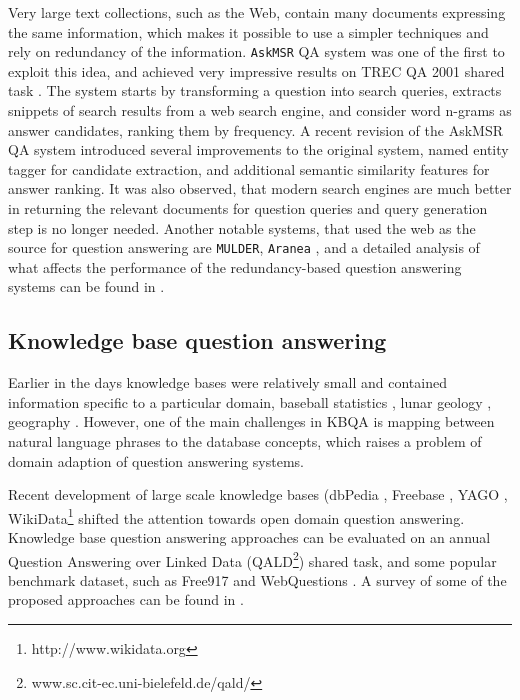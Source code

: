 Very large text collections, such as the Web, contain many documents expressing the same information, which makes it possible to use a simpler techniques and rely on redundancy of the information.
\texttt{AskMSR} QA system was one of the first to exploit this idea, and achieved very impressive results on TREC QA 2001 shared task \cite{brill2002analysis}.
The system starts by transforming a question into search queries, extracts snippets of search results from a web search engine, and consider word n-grams as answer candidates, ranking them by frequency.
A recent revision of the AskMSR QA system \cite{tsai2015web} introduced several improvements to the original system, \ie named entity tagger for candidate extraction, and additional semantic similarity features for answer ranking.
It was also observed, that modern search engines are much better in returning the relevant documents for question queries and query generation step is no longer needed.
Another notable systems, that used the web as the source for question answering are \texttt{MULDER}\cite{kwok2001scaling}, \texttt{Aranea} \cite{lin2003question}, and a detailed analysis of what affects the performance of the redundancy-based question answering systems can be found in \cite{lin2007exploration}.

\subsection{Knowledge base question answering}
\label{sec:rel_work:factoid:kb}

Earlier in the days knowledge bases were relatively small and contained information specific to a particular domain, \eg baseball statistics \cite{green1961baseball}, lunar geology \cite{woods1977lunar}, geography \cite{zelle1996learning}.
However, one of the main challenges in KBQA is mapping between natural language phrases to the database concepts, which raises a problem of domain adaption of question answering systems.

Recent development of large scale knowledge bases (\eg dbPedia \cite{auer2007dbpedia}, Freebase \cite{Bollacker:2008:FCC:1376616.1376746}, YAGO \cite{suchanek2007yago}, WikiData\footnote{http://www.wikidata.org} shifted the attention towards open domain question answering.
Knowledge base question answering approaches can be evaluated on an annual Question Answering over Linked Data (QALD\footnote{www.sc.cit-ec.uni-bielefeld.de/qald/}) shared task, and some popular benchmark dataset, such as Free917 \cite{cai2013large} and WebQuestions \cite{BerantCFL13:sempre}.
A survey of some of the proposed approaches can be found in \cite{unger2014introduction}.

